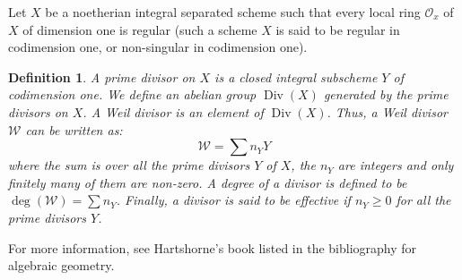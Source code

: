 \documentclass[12pt]{article}
\newtheorem*{defn}{Definition}
\theoremstyle{definition}
\begin{document}
Let $X$ be a noetherian integral separated scheme such that every local ring $\mathcal{O}_x$ of $X$ of dimension one is regular (such a scheme $X$ is said to be regular in codimension one, or non-singular in codimension one).

\begin{defn}
A prime divisor on $X$ is a closed integral subscheme $Y$ of codimension one. We define an abelian group $\operatorname{Div}(X)$ generated by the prime divisors on $X$. A Weil divisor is an element of $\operatorname{Div}(X)$. Thus, a Weil divisor $\mathcal{W}$ can be written as:
$$\mathcal{W}=\sum n_Y Y$$
where the sum is over all the prime divisors $Y$ of $X$, the $n_Y$ are integers and only finitely many of them are non-zero. A degree of a divisor is defined to be $\deg(\mathcal{W})=\sum n_Y$. Finally, a divisor is said to be effective if $n_Y\geq 0$ for all the prime divisors $Y$.
\end{defn}

For more information, see Hartshorne's book listed in the bibliography for algebraic geometry.
\end{document}
